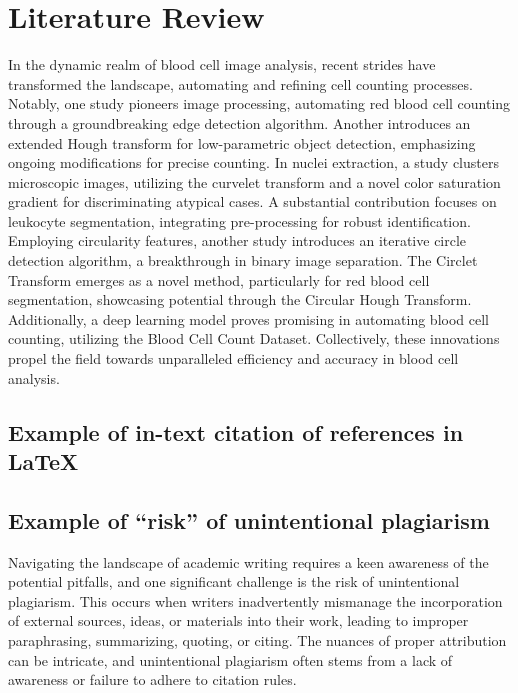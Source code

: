 \chapter{Literature Review}
\label{ch:lit_rev} %

In the dynamic realm of blood cell image analysis, recent strides have transformed the landscape, automating and refining cell counting processes. Notably, one study pioneers image processing, automating red blood cell counting through a groundbreaking edge detection algorithm. Another introduces an extended Hough transform for low-parametric object detection, emphasizing ongoing modifications for precise counting. In nuclei extraction, a study clusters microscopic images, utilizing the curvelet transform and a novel color saturation gradient for discriminating atypical cases. A substantial contribution focuses on leukocyte segmentation, integrating pre-processing for robust identification. Employing circularity features, another study introduces an iterative circle detection algorithm, a breakthrough in binary image separation. The Circlet Transform emerges as a novel method, particularly for red blood cell segmentation, showcasing potential through the Circular Hough Transform. Additionally, a deep learning model proves promising in automating blood cell counting, utilizing the Blood Cell Count Dataset. Collectively, these innovations propel the field towards unparalleled efficiency and accuracy in blood cell analysis.

\section{Example of in-text citation of references in \LaTeX} 
\cite{alomari2014automatic}


\section{Example of ``risk'' of unintentional plagiarism}
Navigating the landscape of academic writing requires a keen awareness of the potential pitfalls, and one significant challenge is the risk of unintentional plagiarism. This occurs when writers inadvertently mismanage the incorporation of external sources, ideas, or materials into their work, leading to improper paraphrasing, summarizing, quoting, or citing. The nuances of proper attribution can be intricate, and unintentional plagiarism often stems from a lack of awareness or failure to adhere to citation rules.

